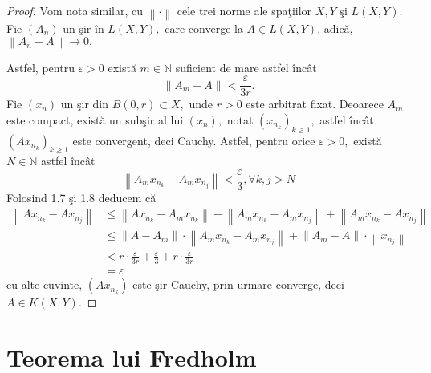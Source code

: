 \documentclass[a4paper,12pt,oneside]{report}
\begin{document}
\begin{proof}
Vom nota similar, cu \(\left \| \cdot  \right \| \) cele trei norme ale spa\c{t}iilor \(X, Y\) \c{s}i \(L\left ( X,Y \right )\). Fie \(\left ( A_{n} \right )\) un \c{s}ir \^{i}n \(L\left ( X,Y \right ),\) care converge la \(A \in L\left ( X,Y \right )\), adic\u{a}, \(\left \| A_{n} - A\right \| \rightarrow 0.\)

Astfel, pentru \(\varepsilon > 0\) exist\u{a}
\(m \in \mathbb{N}\) suficient de mare astfel \^{i}nc\^{a}t
\begin{displaymath}
  \left \| A_{m} - A\right \| < \frac{\varepsilon }{3r}. \label{eq:1.7} \tag{1.7}
\end{displaymath}
Fie \(\left ( x_{n} \right )\) un \c{s}ir din \(B\left ( 0,r \right ) \subset X,\) unde \(r> 0\) este arbitrat fixat. Deoarece \(A_{m}\) este compact, exist\u{a} un sub\c{s}ir al lui \(\left ( x_{n} \right ),\) notat \(\left ( x_{n_{k}} \right ) _{k\geq 1},\) astfel \^{i}nc\^{a}t \(\left ( Ax_{n_{k}} \right )_{k\geq 1}\) este convergent, deci Cauchy. Astfel, pentru orice \(\varepsilon > 0,\) exist\u{a} \(N \in \mathbb{N} \) astfel \^{i}nc\^{a}t
\begin{displaymath}
  \left \| A_{m} x_{n_{k}} - A_{m} x_{n_{j}}\right \| < \frac{\varepsilon }{3}, \forall k,j > N  \label{eq:1.8} \tag{1.8}
\end{displaymath}
Folosind 1.7 \c{s}i 1.8 deducem c\u{a}
\begin{equation} \nonumber
    \begin{split}
      \left \| A x_{n_{k}} - A x_{n_{j}}\right \| &    \leq \left \| A x_{n_{k}} - A_{m} x_{n_{k}}\right \| + \left \| A_{m} x_{n_{k}} - A_{m} x_{n_{j}}\right \| +\left \| A_{m} x_{n_{k}} - A x_{n_{j}}\right \|  \\ & \leq \left \| A - A_{m} \right \|\cdot \left \| A_{m} x_{n_{k}} - A_{m} x_{n_{j}}\right \| + \left \| A_{m} - A\right \| \cdot \left \| x_{n_{j}} \right \| \\ &  < r\cdot \frac{\varepsilon }{3r} + \frac{\varepsilon }{3} + r\cdot \frac{\varepsilon }{3r}  \\ & = \varepsilon
    \end{split}
\end{equation}
cu alte cuvinte, \(\left ( Ax_{n_{k}} \right )\) este \c{s}ir Cauchy, prin urmare converge, deci \(A \in K\left ( X,Y \right ). \)
\end{proof}

\section{Teorema lui Fredholm}
\end{document}
